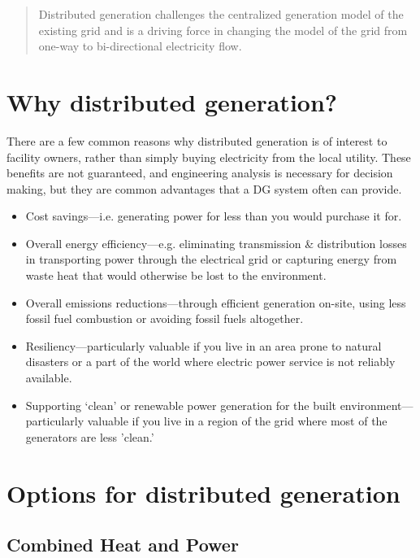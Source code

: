 \documentclass[10pt]{article}
\begin{document}
\begin{quote}
    Distributed generation challenges the centralized
generation model of the existing grid and is a driving
force in changing the model of the grid from one-way to
bi-directional electricity flow. \cite{newenergyfuture}
\end{quote}


\section{Why distributed generation?}

There are a few common reasons why distributed generation is of interest to facility owners, rather than simply buying electricity from the local utility. These benefits are not guaranteed, and engineering analysis is {\color{blue} necessary for decision making, but they are common advantages that a DG system often can} provide.

\begin{itemize}
    \setlength{\itemsep}{0pt}%
    \setlength{\parskip}{0pt}%
    \item Cost savings---i.e. generating power for less than you would purchase it for.
    \item Overall energy efficiency---e.g. eliminating transmission & distribution losses in transporting power through the electrical grid or capturing energy from waste heat that would otherwise be lost to the environment.
    \item Overall emissions reductions---through efficient generation on-site, using less fossil fuel combustion or avoiding {\color{blue}fossil fuels} altogether.
    \item Resiliency---particularly valuable if you live in an area prone to natural disasters or a part of the world where electric power service is not reliably available.
    \item Supporting `clean' or renewable power generation for the built environment---particularly valuable if you live in a region of the grid where most of the generators are less 'clean.'
\end{itemize}

\section{Options for distributed generation}

\subsection{Combined Heat and Power}
\end{document}

